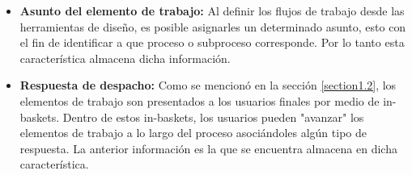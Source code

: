 \begin{itemize}
    \item \textbf{Asunto del elemento de trabajo:} Al definir los flujos de trabajo desde las herramientas de diseño, es posible asignarles un determinado asunto, esto con el fin de identificar a que proceso o subproceso corresponde. Por lo tanto esta característica almacena dicha información.
    
    \item \textbf{Respuesta de despacho:} Como se mencionó en la sección \ref{section1.2}, los elementos de trabajo son presentados a los usuarios finales por medio de in-baskets. Dentro de estos in-baskets, los usuarios pueden "avanzar" los elementos de trabajo a lo largo del proceso asociándoles algún tipo de respuesta. La anterior información es la que se encuentra almacena en dicha característica.
    
\end{itemize}

